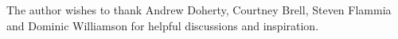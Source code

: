 \documentclass[aps, tightenlines, letterpaper, onecolumn, superscriptaddress, notitlepage, 11pt, groupedaddress]{revtex4-1}
\begin{document}



\begin{acknowledgments}

The author wishes to thank 
Andrew Doherty, Courtney Brell, Steven Flammia and Dominic Williamson
for helpful discussions and inspiration.

\end{acknowledgments}

%
%

\end{document}
